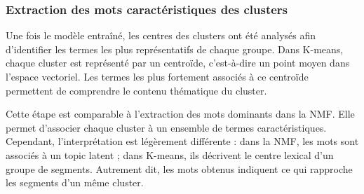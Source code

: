 \subsubsection{Extraction des mots caractéristiques des clusters}

Une fois le modèle entraîné, les centres des clusters ont été analysés afin d'identifier les termes les plus représentatifs de chaque groupe. Dans K-means, chaque cluster est représenté par un centroïde, c'est-à-dire un point moyen dans l'espace vectoriel. Les termes les plus fortement associés à ce centroïde permettent de comprendre le contenu thématique du cluster.

Cette étape est comparable à l'extraction des mots dominants dans la NMF. Elle permet d'associer chaque cluster à un ensemble de termes caractéristiques. Cependant, l'interprétation est légèrement différente : dans la NMF, les mots sont associés à un topic latent ; dans K-means, ils décrivent le centre lexical d'un groupe de segments. Autrement dit, les mots obtenus indiquent ce qui rapproche les segments d'un même cluster.

